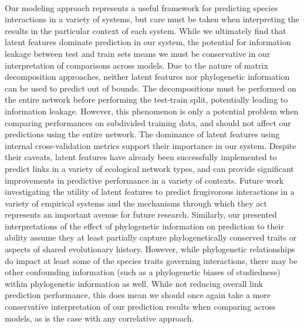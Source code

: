 \documentclass[openacc]{rsproca_new}%
\begin{document}
\paragraph*{} Our modeling approach represents a useful framework for predicting species interactions in a variety of systems, but care must be taken when interpreting the results in the particular context of each system. While we ultimately find that latent features dominate prediction in our system, the potential for information leakage between test and train sets means we must be conservative in our interpretation of comparisons across models. Due to the nature of matrix decomposition approaches, neither latent features nor phylogenetic information can be used to predict out of bounds. The decompositions must be performed on the entire network before performing the test-train split, potentially leading to information leakage. However, this phenomenon is only a potential problem when comparing performances on subdivided training data, and should not affect our predictions using the entire network. The dominance of latent features using internal cross-validation metrics support their importance in our system. Despite their caveats, latent features have already been successfully implemented to predict links in a variety of ecological network types, and can provide significant improvements in predictive performance in a variety of contexts.\cite{banville2023constrains, poisot2021imputing, poisot2023network} Future work investigating the utility of latent features to predict frugivorous interactions in a variety of empirical systems and the mechanisms through which they act represents an important avenue for future research.  Similarly, our presented interpretations of the effect of phylogenetic information on prediction to their ability assume they at least partially capture phylogenetically conserved traits  or aspects of shared evolutionary history. However, while phylogenetic relationships do impact at least some of the species traits governing interactions, there may be other confounding information (such as a phylogenetic  biases of studiedness) within phylogenetic information as well. While not reducing overall link prediction performance, this does mean we should once again take a more conservative interpretation of our prediction results when comparing across models, as is the case with any correlative approach. 
\end{document}
